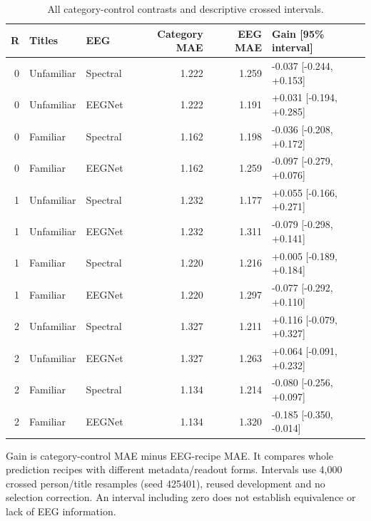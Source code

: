 \documentclass[10pt,a4paper]{article}
\begin{document}
\begin{table}[tbp]
\centering
\small
\caption{All category-control contrasts and descriptive crossed intervals.}
\label{tab:categorygains}
\begin{tabular}{rllrrl}
\toprule
R & Titles & EEG & Category MAE & EEG MAE & Gain [95\% interval] \\
\midrule
0 & Unfamiliar & Spectral & 1.222 & 1.259 & -0.037 [-0.244, +0.153] \\
0 & Unfamiliar & EEGNet & 1.222 & 1.191 & +0.031 [-0.194, +0.285] \\
0 & Familiar & Spectral & 1.162 & 1.198 & -0.036 [-0.208, +0.172] \\
0 & Familiar & EEGNet & 1.162 & 1.259 & -0.097 [-0.279, +0.076] \\
1 & Unfamiliar & Spectral & 1.232 & 1.177 & +0.055 [-0.166, +0.271] \\
1 & Unfamiliar & EEGNet & 1.232 & 1.311 & -0.079 [-0.298, +0.141] \\
1 & Familiar & Spectral & 1.220 & 1.216 & +0.005 [-0.189, +0.184] \\
1 & Familiar & EEGNet & 1.220 & 1.297 & -0.077 [-0.292, +0.110] \\
2 & Unfamiliar & Spectral & 1.327 & 1.211 & +0.116 [-0.079, +0.327] \\
2 & Unfamiliar & EEGNet & 1.327 & 1.263 & +0.064 [-0.091, +0.232] \\
2 & Familiar & Spectral & 1.134 & 1.214 & -0.080 [-0.256, +0.097] \\
2 & Familiar & EEGNet & 1.134 & 1.320 & -0.185 [-0.350, -0.014] \\
\bottomrule
\end{tabular}
\par\medskip\begin{minipage}{0.97\linewidth}\footnotesize Gain is category-control MAE minus EEG-recipe MAE. It compares whole prediction recipes with different metadata/readout forms. Intervals use 4,000 crossed person/title resamples (seed 425401), reused development and no selection correction. An interval including zero does not establish equivalence or lack of EEG information.\end{minipage}
\end{table}
\end{document}
